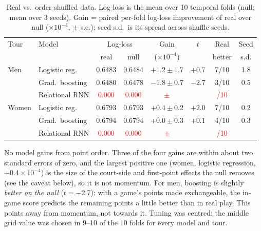 \documentclass[10pt,a4paper]{article}
\newcommand{\ph}[1]{\textcolor{red}{#1}}
\begin{document}
\begin{table}[h]
\centering\small
\caption{Real vs.\ order-shuffled data. Log-loss is the mean over 10 temporal
folds (null: mean over 3 seeds). Gain = paired per-fold log-loss improvement of
real over null ($\times10^{-4}$, $\pm$ s.e.); seed s.d.\ is its spread across
shuffle seeds.}
\label{tab:shuffle}
\begin{tabular}{llcccccc}
\toprule
Tour & Model & \multicolumn{2}{c}{Log-loss} & Gain & $t$ & Real & Seed \\
 & & real & null & ($\times10^{-4}$) & & better & s.d. \\
\midrule
Men   & Logistic reg.  & 0.6483 & 0.6484 & $+1.2\pm1.7$ & $+0.7$ & 7/10 & 1.8 \\
      & Grad.\ boosting & 0.6480 & 0.6478 & $-1.8\pm0.7$ & $-2.7$ & 3/10 & 0.5 \\
      & Relational RNN & \ph{0.000} & \ph{0.000} & \ph{$\pm$} & \ph{} & \ph{/10} & \ph{} \\
Women & Logistic reg.  & 0.6793 & 0.6793 & $+0.4\pm0.2$ & $+2.0$ & 7/10 & 0.2 \\
      & Grad.\ boosting & 0.6794 & 0.6794 & $+0.0\pm0.3$ & $+0.1$ & 4/10 & 0.3 \\
      & Relational RNN & \ph{0.000} & \ph{0.000} & \ph{$\pm$} & \ph{} & \ph{/10} & \ph{} \\
\bottomrule
\end{tabular}
\end{table}

No model gains from point order. Three of the four gains are within about
two standard errors of zero, and the largest positive one (women, logistic
regression, $+0.4\times10^{-4}$) is the size of the court-side and first-point
effects the null removes (see the caveat below), so it is not momentum. For men,
boosting is slightly \emph{better on the null} ($t=-2.7$): with a game's points
made exchangeable, the in-game score predicts the remaining points a little
better than in real play. This points away from momentum, not towards it.
Tuning was centred: the middle grid value was chosen in 9--10 of the 10 folds
for every model and tour.
\end{document}
